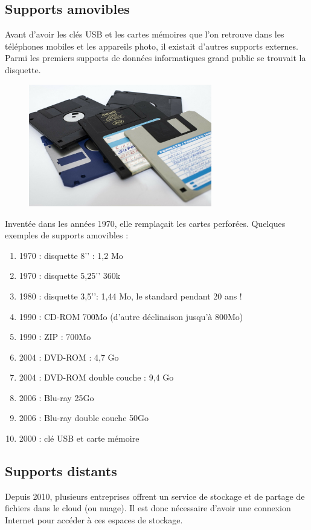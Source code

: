 \documentclass[11pt, a4paper]{book}
\begin{document}
\subsection{Supports amovibles}
Avant d’avoir les clés USB et les cartes mémoires que l’on retrouve dans les téléphones mobiles et les appareils photo, il existait d’autres supports externes. Parmi les premiers supports de données informatiques grand public se trouvait la disquette.

\begin{figure}[ht!]
\centering
\includegraphics[width=8cm]{images/floppy-disk.jpg}
\end{figure}

Inventée dans les années 1970, elle remplaçait les cartes perforées. Quelques exemples de supports amovibles :
\begin{enumerate}
\item[] 1970 : disquette 8’’ : 1,2 Mo
\item[] 1970 : disquette 5,25’’ 360k
\item[] 1980 : disquette 3,5’’: 1,44 Mo, le standard pendant 20 ans !
\item[] 1990 : CD-ROM 700Mo (d’autre déclinaison jusqu’à 800Mo)
\item[] 1990 : ZIP : 700Mo
\item[] 2004 : DVD-ROM : 4,7 Go
\item[] 2004 : DVD-ROM double couche : 9,4 Go
\item[] 2006 : Blu-ray 25Go
\item[] 2006 : Blu-ray double couche 50Go
\item[] 2000 : clé USB et carte mémoire
\end{enumerate}

\subsection{Supports distants}
Depuis 2010, plusieurs entreprises offrent un service de stockage et de partage de fichiers dans le cloud (ou nuage). Il est donc nécessaire d’avoir une connexion Internet pour accéder à ces espaces de stockage.
\end{document}
